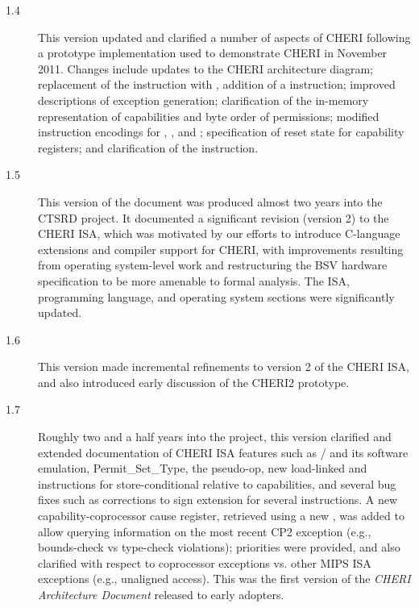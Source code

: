 \begin{description}
\item[1.4] This version updated and clarified a number of aspects of CHERI
  following a prototype implementation used to demonstrate CHERI in November
  2011.
  Changes include updates to the CHERI architecture diagram; replacement of
  the  instruction with ,
  addition of a  instruction;
  improved descriptions of exception generation; clarification of the
  in-memory representation of capabilities and byte order of permissions;
  modified instruction encodings for ,
  , and ;
  specification of reset state for capability registers; and clarification of
  the  instruction.

\item[1.5] This version of the document was produced almost two years
  into the CTSRD project.  It documented a significant revision (version 2) to
  the CHERI ISA, which was motivated by our efforts to introduce
  C-language extensions and compiler support for CHERI, with
  improvements resulting from operating system-level work and
  restructuring the BSV hardware specification to be more
  amenable to formal analysis.  The ISA, programming language, and
  operating system sections were significantly updated.

\item[1.6] This version made incremental refinements to version 2 of the
  CHERI ISA, and also introduced early discussion of the CHERI2 prototype.

\item[1.7] Roughly two and a half years into the project, this version
  clarified and extended documentation of CHERI ISA features such as
  / and its software emulation,
  Permit\_Set\_Type, the 
  pseudo-op, new load-linked and instructions for store-conditional relative
  to capabilities, and several bug fixes such as corrections to sign extension
  for several instructions.
  A new capability-coprocessor {\pathname cause} register, retrieved using a new
  , was added to allow querying information on the
  most recent
  CP2 exception (e.g., bounds-check vs type-check violations); priorities were
  provided, and also clarified with respect to coprocessor exceptions vs.
  other MIPS ISA exceptions (e.g., unaligned access).
  This was the first version of the {\em CHERI Architecture Document} released
  to early adopters.


\end{description}
